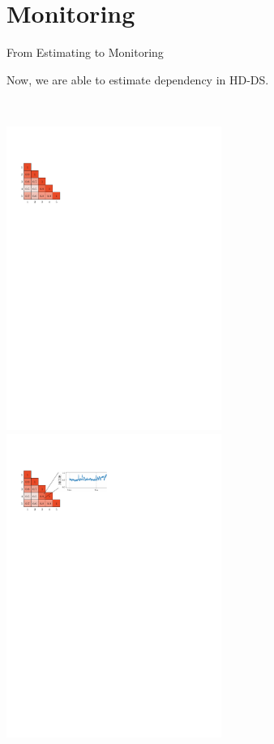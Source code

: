 \documentclass[16pt,usenames,dvipsnames, notheorems]{beamer}
\theoremstyle{definition}
\theoremstyle{example}
\theoremstyle{plain}
\begin{document}
\section{Monitoring}

\begin{frame}{From Estimating to Monitoring}

Now, we are able to estimate dependency in HD-DS. 

~\\
\begin{overprint}
	 \includegraphics[width=7cm,scale=0.5]{figures/correlation_matrix_bis_1.pdf}
	\onslide<2> \includegraphics[width=7cm,scale=0.5]{figures/correlation_matrix_bis_2.pdf}

\end{overprint}
\end{frame}
\end{document}
